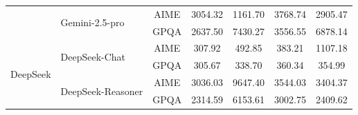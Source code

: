 \documentclass[letterpaper,twocolumn,10pt]{article}
\begin{document}
\begin{table}[t!]
{\begin{tabular}{llccccc}
& \multirow{2}{*}{Gemini-2.5-pro} 
  & AIME & 3054.32 & \cellcolor{myblue!20}1161.70 & \cellcolor{myred!20}3768.74 & \cellcolor{mygreen}2905.47 \\
& & GPQA & 2637.50 & \cellcolor{myred!20}7430.27 & \cellcolor{myred!20}3556.55 & \cellcolor{myred!20}6878.14 \\
\midrule

\multirow{4}{*}{DeepSeek} 
& \multirow{2}{*}{DeepSeek-Chat} 
  & AIME & 307.92 & \cellcolor{myred!20}492.85 & \cellcolor{myred!20}383.21 & \cellcolor{myred!20}1107.18 \\
& & GPQA & 305.67 & \cellcolor{mygreen}338.70 & \cellcolor{mygreen}360.34 & \cellcolor{mygreen}354.99 \\
\cmidrule{2-7}

& \multirow{2}{*}{DeepSeek-Reasoner} 
  & AIME & 3036.03 & \cellcolor{myred!20}9647.40 & \cellcolor{mygreen}3544.03 & \cellcolor{mygreen}3404.37 \\
& & GPQA & 2314.59 & \cellcolor{myred!20}6153.61 & \cellcolor{myred!20}3002.75 & \cellcolor{mygreen}2409.62 \\

\bottomrule
\end{tabular}
}
\end{table}
\end{document}

